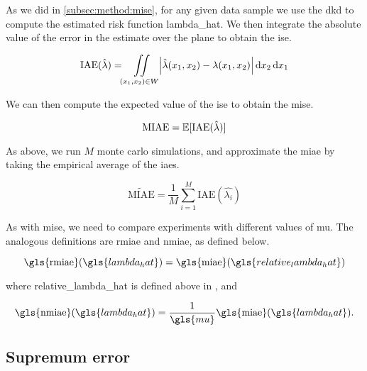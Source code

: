 As we did in \autoref{subsec:method:mise}, for any given data sample we use the \gls{dkd} to compute the estimated risk function \gls{lambda_hat}.
We then integrate the absolute value of the error in the estimate over the plane to obtain the \gls{ise}.

\begin{equation}
    \mbox{IAE}(\hat{\lambda}) = 
        \iint\limits_{(x_1, x_2) \in W}\!{
            \left| \hat{\lambda}(x_1, x_2) - \lambda(x_1, x_2) \right|
         \mathop{}\!\mathrm{d}{x_2} \mathop{}\!\mathrm{d}{x_1}}
\end{equation}

We can then compute the expected value of the \gls{ise} to obtain the \gls{mise}.

\begin{equation}
    \mbox{MIAE} = \mathbb{E} [\mbox{IAE}(\hat{\lambda})]
\end{equation}

As above, we run $M$ monte carlo simulations,
and approximate the \gls{miae} by taking the empirical average of the \glspl{iae}.

\begin{equation}
    \widetilde{\mbox{MIAE}} = \frac{1}{M} \sum_{i=1}^{M} \mbox{IAE}(\hat{\lambda_i})
\end{equation}

As with \gls{mise}, we need to compare experiments with different values of \gls{mu}.
The analogous definitions are \gls{rmiae} and \gls{nmiae}, as defined below.

\begin{equation}
\label{eq:rmiae}
    \mbox{\gls{rmiae}}(\gls{lambda_hat}) = 
        \mbox{\gls{miae}}(\gls{relative_lambda_hat}) \\
\end{equation}

where \gls{relative_lambda_hat} is defined above in ,
and

\begin{equation}
\label{eq:nmiae}
    \mbox{\gls{nmiae}}(\gls{lambda_hat}) = 
        \frac{1}{\gls{mu}} \mbox{\gls{miae}}(\gls{lambda_hat}) \text{.}
\end{equation}


\subsection{Supremum error}
\label{subsec:method:sup_error}

